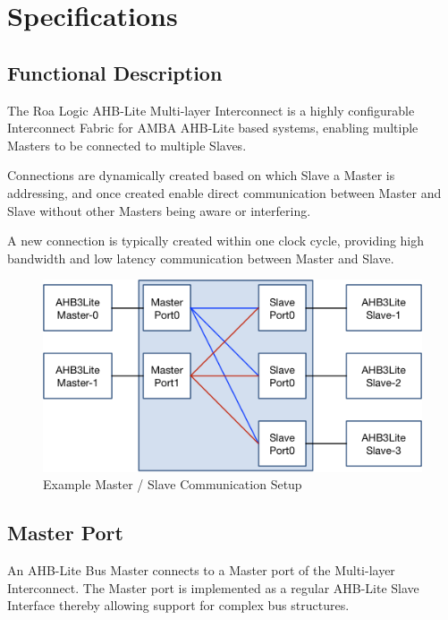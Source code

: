 \chapter{Specifications}\label{specifications}


\section{Functional Description}\label{functional-description}


The Roa Logic AHB-Lite Multi-layer Interconnect is a highly configurable
Interconnect Fabric for AMBA AHB-Lite based systems, enabling multiple
Masters to be connected to multiple Slaves.

Connections are dynamically created based on which Slave a Master is
addressing, and once created enable direct communication between Master
and Slave without other Masters being aware or interfering.

A new connection is typically created within one clock cycle, providing
high bandwidth and low latency communication between Master and Slave.

\begin{figure}[tbh]
	\includegraphics{assets/img/ahb-lite-switch-sys1}
	\caption{Example Master / Slave Communication Setup}
	\label{fig:ahb-lite-switch-sys1}
\end{figure}

\section{Master Port}\label{master-port}

An AHB-Lite Bus Master connects to a Master port of the Multi-layer
Interconnect. The Master port is implemented as a regular AHB-Lite Slave
Interface thereby allowing support for complex bus structures.

